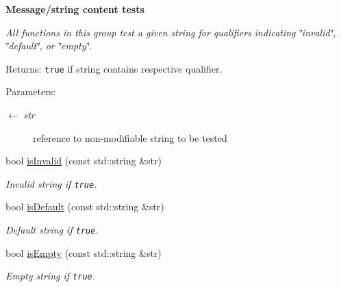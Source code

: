 \begin{Indent}{\bf Message/string content tests}\par
{\em All functions in this group test a given string for qualifiers indicating \char`\"{}invalid\char`\"{}, \char`\"{}default\char`\"{}, or \char`\"{}empty\char`\"{}.

\begin{Desc}
\item[Returns:]{\tt true} if string contains respective qualifier.\end{Desc}
\begin{Desc}
\item[Parameters:]
\begin{description}
\item[\mbox{$\leftarrow$} {\em str}]reference to non-modifiable string to be tested \end{description}
\end{Desc}
}\begin{CompactItemize}
\item 
\hypertarget{classConfiguration_1_1ConfigData_077fe69f8e4730023b16bb046f167100}{
bool \hyperlink{classConfiguration_1_1ConfigData_077fe69f8e4730023b16bb046f167100}{is\-Invalid} (const std::string \&str)}
\label{classConfiguration_1_1ConfigData_077fe69f8e4730023b16bb046f167100}

\begin{CompactList}\small\item\em Invalid string if {\tt true}. \item\end{CompactList}\item 
\hypertarget{classConfiguration_1_1ConfigData_e80f5feecd07a36fc833e432311db5f6}{
bool \hyperlink{classConfiguration_1_1ConfigData_e80f5feecd07a36fc833e432311db5f6}{is\-Default} (const std::string \&str)}
\label{classConfiguration_1_1ConfigData_e80f5feecd07a36fc833e432311db5f6}

\begin{CompactList}\small\item\em Default string if {\tt true}. \item\end{CompactList}\item 
\hypertarget{classConfiguration_1_1ConfigData_895ac06ef5341187550d5341987c0eff}{
bool \hyperlink{classConfiguration_1_1ConfigData_895ac06ef5341187550d5341987c0eff}{is\-Empty} (const std::string \&str)}
\label{classConfiguration_1_1ConfigData_895ac06ef5341187550d5341987c0eff}

\begin{CompactList}\small\item\em Empty string if {\tt true}. \item\end{CompactList}\end{CompactItemize}
\end{Indent}

